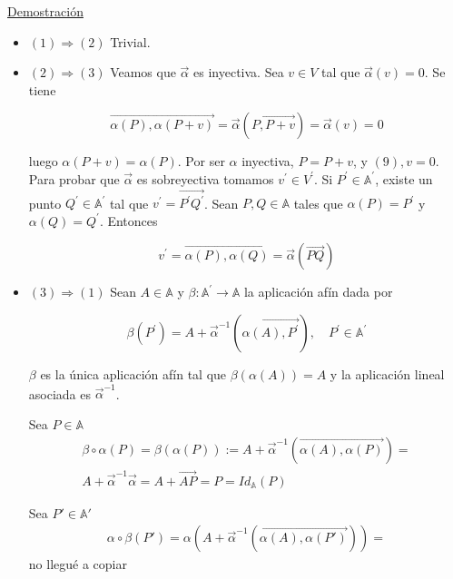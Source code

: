 \documentclass[12pt, a4paper, ones, notitlepage, openany,titlepage]{article}
\newcommand{\demostracion}{\noindent\underline{Demostración}}
\begin{document}
\demostracion 
	\begin{itemize}
		\item$(1) \Rightarrow(2)$ Trivial.
		
		\item$(2) \Rightarrow(3)$ Veamos que $\overrightarrow{\alpha}$ es inyectiva. Sea $v \in V$ tal que $\overrightarrow{\alpha}(v)=0$. Se tiene
		
		$$
		\overrightarrow{\alpha(P), \alpha(P+v)}=\overrightarrow{\alpha}(\overrightarrow{P, P+v})=\overrightarrow{\alpha}(v)=0
		$$
		
		luego $\alpha(P+v)=\alpha(P)$. Por ser $\alpha$ inyectiva, $P=P+v$, y $(9), v=0$. Para probar que $\overrightarrow{\alpha}$ es sobreyectiva tomamos $v^{\prime} \in V^{\prime}$. Si $P^{\prime} \in \mathbb{A}^{\prime}$, existe un punto $Q^{\prime} \in \mathbb{A}^{\prime}$ tal que $v^{\prime}=\overrightarrow{P^{\prime} Q^{\prime}}$. Sean $P, Q \in \mathbb{A}$ tales que $\alpha(P)=P^{\prime}$ y $\alpha(Q)=Q^{\prime}$. Entonces
		
		$$
		v^{\prime}=\overrightarrow{\alpha(P), \alpha(Q)}=\overrightarrow{\alpha}(\overrightarrow{P Q})
		$$
		
		\item$(3) \Rightarrow(1)$ Sean $A \in \mathbb{A}$ y $\beta: \mathbb{A}^{\prime} \rightarrow \mathbb{A}$ la aplicación afín dada por
		
		$$
		\beta\left(P^{\prime}\right)=A+\overrightarrow{\alpha}^{-1}\left(\overrightarrow{\alpha(A), P^{\prime}}\right), \quad P^{\prime} \in \mathbb{A}^{\prime}
		$$
		
		$\beta$ es la única aplicación afín tal que $\beta(\alpha(A))=A$ y la aplicación lineal asociada es $\overrightarrow{\alpha}^{-1}$.
		
		Sea $P\in\mathbb{A}$
		\begin{gather*}
			\beta\circ\alpha(P)=\beta(\alpha(P)):=A+\overrightarrow{\alpha}^{-1}(\overrightarrow{\alpha(A),\alpha(P)}) =\\ A+\overrightarrow{\alpha}^{-1}\overrightarrow{\alpha}=A+\overrightarrow{AP}=P=Id_{\mathbb{A}}(P)
		\end{gather*}
		
		Sea $P'\in\mathbb{A'}$
		\begin{gather*}
			\alpha\circ\beta(P')=\alpha(A+\overrightarrow{\alpha}^{-1}(\overrightarrow{\alpha(A),\alpha(P')})) = 
		\end{gather*} no llegué a copiar
	\end{itemize}
\end{document}
